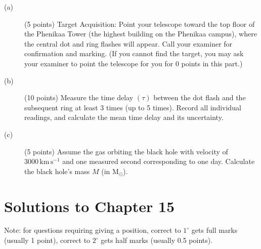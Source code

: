 \begin{description}
\item[(a)] (5 points) Target Acquisition: Point your telescope toward the top
  floor of the Phenikaa Tower (the highest building on the Phenikaa campus),
  where the central dot and ring flashes will appear. Call your examiner for
  confirmation and marking. (If you cannot find the target, you may ask your
  examiner to point the telescope for you for 0 points in this part.)
\item[(b)] (10 points) Measure the time delay $(\tau)$ between the dot flash
  and the subsequent ring at least 3 times (up to 5 times). Record all
  individual readings, and calculate the mean time delay and its uncertainty.
\item[(c)] (5 points) Assume the gas orbiting the black hole with velocity of
  $3000\,\mathrm{km\,s^{-1}}$ and one measured second corresponding to one
  day. Calculate the black hole's mass $M$ (in $\mathrm{M}_\odot$).
\end{description}

\clearpage
\section*{Solutions to Chapter 15}

Note: for questions requiring giving a position, correct to $1^\circ$ gets
full marks (usually 1 point), correct to $2^\circ$ gets half marks (usually
0.5 points).

